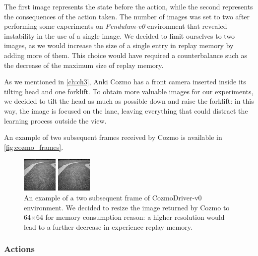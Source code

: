 The first image represents the state before the action, while the second represents the consequences of the action taken.
The number of images was set to two after performing some experiments on \textit{Pendulum-v0} environment that revealed instability in the use of a single image.
We decided to limit ourselves to two images, as we would increase the size of a single entry in replay memory by adding more of them.
This choice would have required a counterbalance such as the decrease of the maximum size of replay memory.

As we mentioned in \vref{ch:ch3}, Anki Cozmo has a front camera inserted inside its tilting head and one forklift.
To obtain more valuable images for our experiments, we decided to tilt the head as much as possible down and raise the forklift: in this way, the image is focused on the lane, leaving everything that could distract the learning process outside the view.

An example of two subsequent frames received by Cozmo is available in \vref{fig:cozmo_frames}.
\begin{figure}

	\begin{minipage}[t]{0.5\linewidth}
		\centering
		\includegraphics[height=0.25\paperwidth]{img/cozmo_frame_1.jpg}
	\end{minipage}
	\begin{minipage}[t]{0.5\linewidth}
		\centering
		\includegraphics[height=0.25\paperwidth]{img/cozmo_frame_2.jpg}
	\end{minipage}

	\caption[Example of two subsequent frames of CozmoDriver-v0]{An example of a two subsequent frame of CozmoDriver-v0 environment.
		We decided to resize the image returned by Cozmo to 64$\times$64 for memory consumption reason: a higher resolution would lead to a further decrease in experience replay memory.}
	\label{fig:cozmo_frames}
\end{figure}

\subsubsection{Actions}

